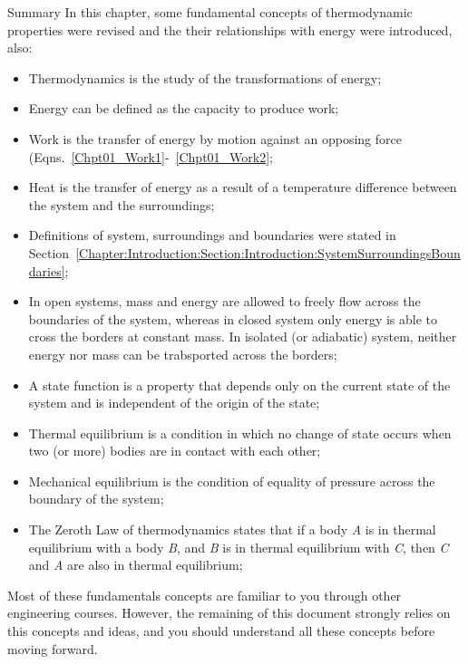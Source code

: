 \clearpage   
\begin{FinalSummaryBlock}{Summary}
    In this chapter, some fundamental concepts of thermodynamic properties were revised and the their relationships with energy were introduced, also:
    \begin{itemize}
       \item Thermodynamics is the study of the transformations of energy;
       \item Energy can be defined as the capacity to produce work;
       \item Work is the transfer of energy by motion against an opposing force (Eqns.~\ref{Chpt01_Work1}-~\ref{Chpt01_Work2};
       \item Heat is the transfer of energy  as a result of a temperature difference between the system and the surroundings;
       \item Definitions of system, surroundings and boundaries were stated in Section~\ref{Chapter:Introduction:Section:Introduction:SystemSurroundingsBoundaries};
       \item In open systems, mass and energy are allowed to freely flow across the boundaries of the system, whereas in closed system only energy is able to cross the borders at constant mass. In isolated (or adiabatic) system, neither energy nor mass can be trabsported across the borders;
       \item A state function is a property that depends only on the current state of the system and is independent of the origin of the state; 
       \item Thermal equilibrium is a condition in which no change of state occurs when two (or more) bodies are in contact with each other;
       \item Mechanical equilibrium is the condition of equality of pressure across the boundary of the system;
       \item The Zeroth Law of thermodynamics states that if a body {\it A} is in thermal equilibrium with a body {\it B}, and {\it B} is in thermal equilibrium with {\it C}, then {\it C} and {\it A} are also in thermal equilibrium;
    \end{itemize} 
   
     Most of these fundamentals concepts are familiar to you through other engineering courses. However, the remaining of this document strongly relies on this concepts and ideas, and you should understand all these concepts before moving forward.
\end{FinalSummaryBlock}



%
